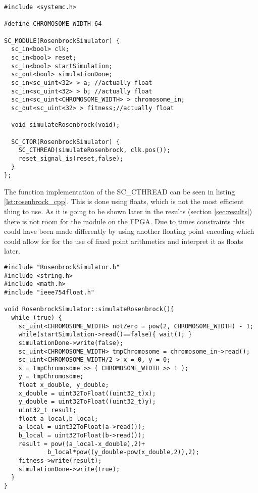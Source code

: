 \begin{lstlisting}[style=customc++,caption={RosenbrockSimulator.h},label={lst:rosenbrock_h}]
#include <systemc.h>

#define CHROMOSOME_WIDTH 64

SC_MODULE(RosenbrockSimulator) {
  sc_in<bool> clk;
  sc_in<bool> reset;
  sc_in<bool> startSimulation;
  sc_out<bool> simulationDone;
  sc_in<sc_uint<32> > a; //actually float
  sc_in<sc_uint<32> > b; //actually float
  sc_in<sc_uint<CHROMOSOME_WIDTH> > chromosome_in;
  sc_out<sc_uint<32> > fitness;//actually float

  void simulateRosenbrock(void);

  SC_CTOR(RosenbrockSimulator) {
    SC_CTHREAD(simulateRosenbrock, clk.pos());
    reset_signal_is(reset,false);
  }
};
\end{lstlisting}

The function implementation of the SC\_CTHREAD can be seen in listing \ref{lst:rosenbrock_cpp}. This is done using floats, which is not the most efficient thing to use. As it is going to be shown later in the results (section \ref{sec:results}) there is not room for the module on the FPGA. Due to times constraints this could have been made differently by using another floating point encoding which could allow for for the use of fixed point arithmetics and interpret it as floats later.

\begin{lstlisting}[style=customc++,caption={RosenbrockSimulator.cpp},label={lst:rosenbrock_cpp}]
#include "RosenbrockSimulator.h"
#include <string.h>
#include <math.h>
#include "ieee754float.h"

void RosenbrockSimulator::simulateRosenbrock(){
  while (true) {
    sc_uint<CHROMOSOME_WIDTH> notZero = pow(2, CHROMOSOME_WIDTH) - 1;
    while(startSimulation->read()==false){ wait(); }
    simulationDone->write(false);
    sc_uint<CHROMOSOME_WIDTH> tmpChromosome = chromosome_in->read();
    sc_uint<CHROMOSOME_WIDTH/2 > x = 0, y = 0;
    x = tmpChromosome >> ( CHROMOSOME_WIDTH >> 1 );
    y = tmpChromosome;
    float x_double, y_double;
    x_double = uint32ToFloat((uint32_t)x);
    y_double = uint32ToFloat((uint32_t)y);
    uint32_t result;
    float a_local,b_local;
    a_local = uint32ToFloat(a->read());
    b_local = uint32ToFloat(b->read());
    result = pow((a_local-x_double),2)+
    		b_local*pow((y_double-pow(x_double,2)),2);
    fitness->write(result);
    simulationDone->write(true);
  }
}
\end{lstlisting}

